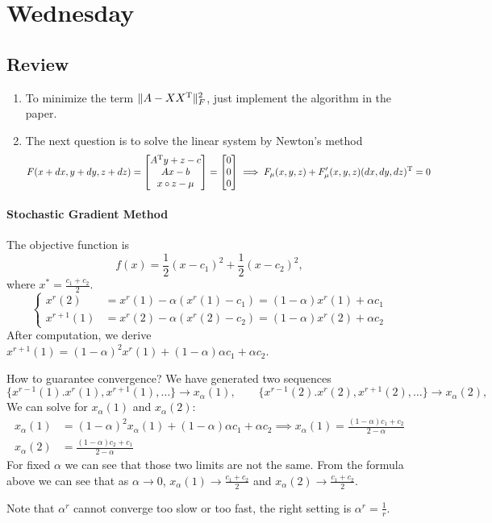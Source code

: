 
\section{Wednesday}
\subsection{Review}
\begin{enumerate}
\item
To minimize the term $\|A - XX^{\mathrm T}\|_F^2$, just implement the algorithm in the paper. 
\item
The next question is to solve the linear system by Newton's method
\[
F(x+dx,y+dy,z+dz)=\begin{bmatrix}
A^{\mathrm T} y+z - c\\
Ax-b\\
x\circ z - \mu
\end{bmatrix}=\begin{bmatrix}
0\\0\\0
\end{bmatrix}\implies
F_\mu(x,y,z)+F'_{\mu}(x,y,z)(dx,dy,dz)^{\mathrm T}=0
\]
\end{enumerate}
\paragraph{Stochastic Gradient Method}
The objective function is
\[
f(x)=\frac{1}{2}(x-c_1)^2+\frac{1}{2}(x-c_2)^2,
\]
where $x^*=\frac{c_1+c_2}{2}$.
\[
\left\{
\begin{aligned}
x^r(2) &= x^r(1) - \alpha (x^r(1)-c_1)=(1-\alpha)x^r(1) + \alpha c_1\\
x^{r+1}(1)&=x^r(2) - \alpha(x^r(2) - c_2)=(1-\alpha)x^r(2) + \alpha c_2
\end{aligned}
\right.
\]
After computation, we derive $x^{r+1}(1) = (1-\alpha)^2x^r(1) + (1-\alpha)\alpha c_1+\alpha c_2$.

How to guarantee convergence? We have generated two sequences
\[
\{
x^{r-1}(1).x^r(1),x^{r+1}(1),\dots
\}\to x_\alpha(1),\qquad
\{
x^{r-1}(2).x^r(2),x^{r+1}(2),\dots
\}\to x_\alpha(2),
\]
We can solve for $x_\alpha(1)$ and $x_\alpha(2)$:
\begin{align*}
x_\alpha(1)&=(1-\alpha)^2x_\alpha(1) + (1-\alpha)\alpha c_1+\alpha c_2\implies
x_\alpha(1)=\frac{(1-\alpha)c_1+c_2}{2-\alpha}\\
x_\alpha(2)&=\frac{(1-\alpha)c_2+c_1}{2-\alpha}
\end{align*}
For fixed $\alpha$ we can see that those two limits are not the same. From the formula above we can see that as $\alpha\to0$, $x_\alpha(1)\to\frac{c_1+c_2}{2}$ and $x_\alpha(2)\to\frac{c_1+c_2}{2}$.
\begin{remark}
Note that $\alpha^r$ cannot converge too slow or too fast, the right setting is $\alpha^r=\frac{1}{r}$.
\end{remark}
